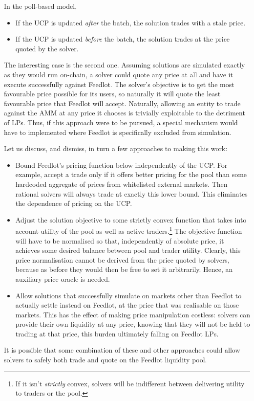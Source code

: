 \documentclass[a4paper,10pt]{article}
\theoremstyle{remark}
\begin{document}
In the poll-based model, 
\begin{itemize}
  \item If the UCP is updated \emph{after} the batch, the solution trades with a stale price.
  \item If the UCP is updated \emph{before} the batch, the solution trades at the price quoted by the solver.
\end{itemize}
The interesting case is the second one. 
%
Assuming solutions are simulated exactly as they would run on-chain, a solver could quote any price at all and have it execute successfully against Feedlot.
%
The solver's objective is to get the most favourable price possible for its users, so naturally it will quote the least favourable price that Feedlot will accept.
%
Naturally, allowing an entity to trade against the AMM at any price it chooses is trivially exploitable to the detriment of LPs.
%
Thus, if this approach were to be pursued, a special mechanism would have to implemented where Feedlot is specifically excluded from simulation.

Let us discuss, and dismiss, in turn a few approaches to making this work:
\begin{itemize}
  \item 
    Bound Feedlot's pricing function below independently of the UCP. For example, accept a trade only if it offers better pricing for the pool than some hardcoded aggregate of prices from whitelisted external markets.
    Then rational solvers will always trade at exactly this lower bound.
    This eliminates the dependence of pricing on the UCP.
    
  \item
    Adjust the solution objective to some strictly convex function that takes into account utility of the pool as well as active traders.\footnote{If it isn't \emph{strictly} convex, solvers will be indifferent between delivering utility to traders or the pool.}
    The objective function will have to be normalised so that, independently of absolute price, it achieves some desired balance between pool and trader utility.
    Clearly, this price normalisation cannot be derived from the price quoted by solvers, because as before they would then be free to set it arbitrarily.
    Hence, an auxiliary price oracle is needed.
    
  \item
    Allow solutions that successfully simulate on markets other than Feedlot to actually settle instead on Feedlot, at the price that was realisable on those markets.
    This has the effect of making price manipulation costless: solvers can provide their own liquidity at any price, knowing that they will not be held to trading at that price, this burden ultimately falling on Feedlot LPs.
    
\end{itemize}
It is possible that some combination of these and other approaches could allow solvers to safely both trade and quote on the Feedlot liquidity pool.
\end{document}
